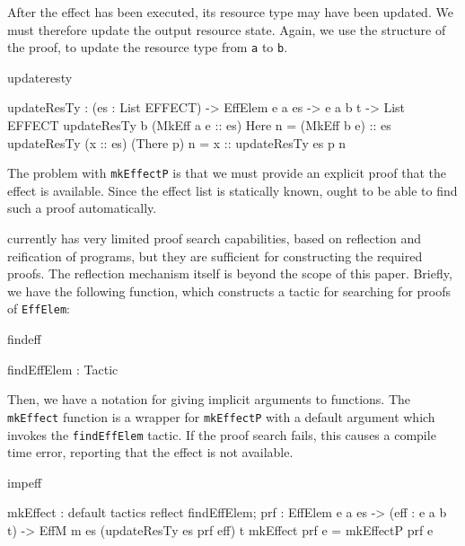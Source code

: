 After the effect has been executed, its resource type may have been updated.
We must therefore update the output resource state. Again, we use the structure
of the proof, to update the resource type from \texttt{a} to \texttt{b}.

\begin{SaveVerbatim}{updateresty}

updateResTy : (es : List EFFECT) -> 
              EffElem e a es -> e a b t -> List EFFECT
updateResTy {b} (MkEff a e :: es) Here      n 
                 = (MkEff b e) :: es
updateResTy     (x :: es)         (There p) n 
                 = x :: updateResTy es p n

\end{SaveVerbatim}

\noindent
The problem with \texttt{mkEffectP} is that we must provide an 
explicit proof that the effect is available. Since the effect list is statically
known, \Idris{} ought to be able to find such a proof automatically.

\Idris{} currently has very limited proof search capabilities, based on
reflection and reification of \Idris{} programs, but they
are sufficient for constructing the required proofs. The reflection mechanism
itself is beyond the scope of this paper. Briefly, we have
the following function, which constructs a tactic for searching for proofs 
of \texttt{EffElem}:

\begin{SaveVerbatim}{findeff}

findEffElem : Tactic 

\end{SaveVerbatim}

\noindent
Then, we have a notation for giving  implicit arguments to
functions. The \texttt{mkEffect} function is a wrapper for \texttt{mkEffectP}
with a default argument which invokes the \texttt{findEffElem} tactic. If
the proof search fails, this causes a compile time error, reporting that the
effect is not available.

\label{sect:mkeffect}
\begin{SaveVerbatim}{impeff}

mkEffect : {default tactics { 
                       reflect findEffElem; 
                    } 
              prf : EffElem e a es} -> 
           (eff : e a b t) -> 
           EffM m es (updateResTy es prf eff) t
mkEffect {prf} e = mkEffectP prf e

\end{SaveVerbatim}

